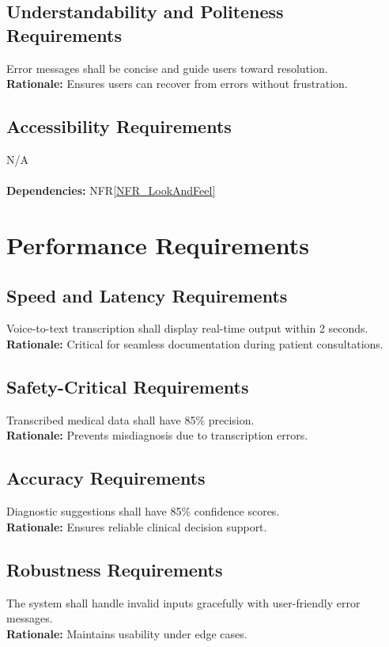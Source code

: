 \documentclass[12pt]{article}
\begin{document}
\subsection{Understandability and Politeness Requirements}
Error messages shall be concise and guide users toward resolution.  \\
\textbf{Rationale:} Ensures users can recover from errors without frustration.

\subsection{Accessibility Requirements}
N/A
\\
  \\
\textbf{Dependencies:} NFR\ref{NFR_LookAndFeel}

\section{Performance Requirements} \label{NFR_Performance}
\subsection{Speed and Latency Requirements}
Voice-to-text transcription shall display real-time output within 2 seconds.  \\
\textbf{Rationale:} Critical for seamless documentation during patient consultations.

\subsection{Safety-Critical Requirements}
Transcribed medical data shall have 85\% precision.  \\
\textbf{Rationale:} Prevents misdiagnosis due to transcription errors.

\subsection{Accuracy Requirements}
Diagnostic suggestions shall have 85\% confidence scores.  \\
\textbf{Rationale:} Ensures reliable clinical decision support.

\subsection{Robustness Requirements}
The system shall handle invalid inputs gracefully with user-friendly error messages.  \\
\textbf{Rationale:} Maintains usability under edge cases.
\end{document}
